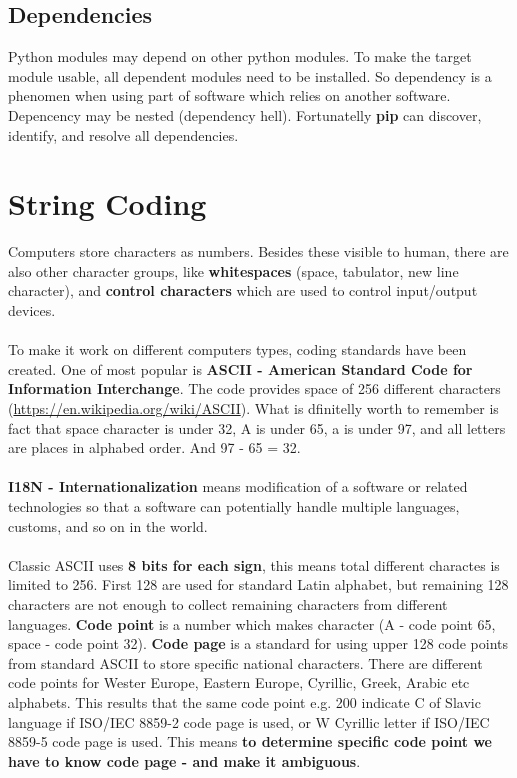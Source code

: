 \documentclass{article}
\begin{document}
\subsection{Dependencies}
Python modules may depend on other python modules. To make the target module usable, all dependent modules need to be installed. So dependency is a phenomen when using part of software which relies on another software. Depencency may be nested (dependency hell). Fortunatelly \textbf{pip} can discover, identify, and resolve all dependencies. 


\newpage
\section{String Coding}
Computers store characters as numbers. Besides these visible to human, there are also other character groups, like \textbf{whitespaces} (space, tabulator, new line character), and \textbf{control characters} which are used to control input/output devices.
\paragraph{}
To make it work on different computers types, coding standards have been created. One of most popular is \textbf{ASCII - American Standard Code for Information Interchange}. The code provides space of 256 different characters (\url{https://en.wikipedia.org/wiki/ASCII}). What is dfinitelly worth to remember is fact that space character is under 32, A is under 65, a is under 97, and all letters are places in alphabed order. And 97 - 65 = 32.
\paragraph{}
\textbf{I18N - Internationalization} means modification of a software or related technologies so that a software can potentially handle multiple languages, customs, and so on in the world.
\paragraph{}
Classic ASCII uses \textbf{8 bits for each sign}, this means total different charactes is limited to 256. First 128 are used for standard Latin alphabet, but remaining 128 characters are not enough to collect remaining characters from different languages. \textbf{Code point} is a number which makes character (A - code point 65, space - code point 32). \textbf{Code page} is a standard for using upper 128 code points from standard ASCII to store specific national characters. There are different code points for Wester Europe, Eastern Europe, Cyrillic, Greek, Arabic etc alphabets. This results that the same code point e.g. 200 indicate C of Slavic language if ISO/IEC 8859-2 code page is used, or W Cyrillic letter if ISO/IEC 8859-5 code page is used. This means \textbf{to determine specific code point we have to know code page - and make it ambiguous}.
\end{document}
